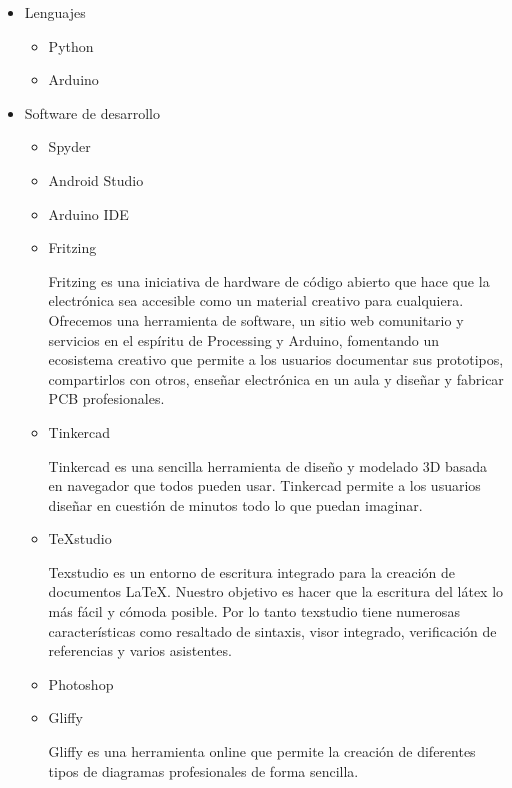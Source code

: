 \documentclass{pclass}
\begin{document}
\begin{itemize}
\begin{itemize}
			\cite{raspbian}
				
	\end{itemize}
	\item Lenguajes
		\begin{itemize}
			\item Python
			\item Arduino
		\end{itemize}
	\item Software de desarrollo
	\begin{itemize}
		\item Spyder
		\item Android Studio
		\item Arduino IDE
		\item Fritzing
		
		Fritzing es una iniciativa de hardware de código abierto que hace que la electrónica sea accesible como un material creativo para cualquiera. Ofrecemos una herramienta de software, un sitio web comunitario y servicios en el espíritu de Processing y Arduino, fomentando un ecosistema creativo que permite a los usuarios documentar sus prototipos, compartirlos con otros, enseñar electrónica en un aula y diseñar y fabricar PCB profesionales.
			\cite{fritzing}
		
		\item Tinkercad
		
		Tinkercad es una sencilla herramienta de diseño y modelado 3D basada en navegador que todos pueden usar. Tinkercad permite a los usuarios diseñar en cuestión de minutos todo lo que puedan imaginar.
			\cite{tinkercad}
			
		\item TeXstudio
		
		Texstudio es un entorno de escritura integrado para la creación de documentos LaTeX. Nuestro objetivo es hacer que la escritura del látex lo más fácil y cómoda posible. Por lo tanto texstudio tiene numerosas características como resaltado de sintaxis, visor integrado, verificación de referencias y varios asistentes.
			\cite{texstudio}
		\item Photoshop
		\item Gliffy
		
		Gliffy es una herramienta online que permite la creación de diferentes tipos de diagramas profesionales de forma sencilla.
			\cite{gliffy}
		
	\end{itemize}
\end{itemize}
\end{document}
